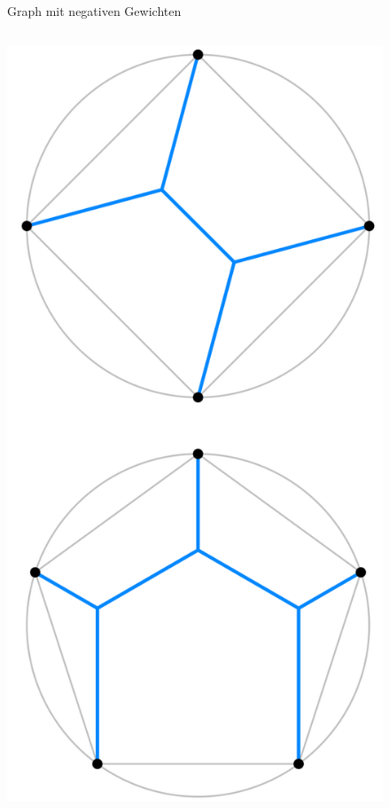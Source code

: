 \begin{frame}
{\begin{figure}
	\caption{Graph mit negativen Gewichten}
	\end{figure}
}




 	{
					\begin{columns}
							\begin{figure}
								\includegraphics[scale=0.2]{pictures/euclidean-steiner-trees}

\end{figure}
\end{columns}}
\end{frame}
